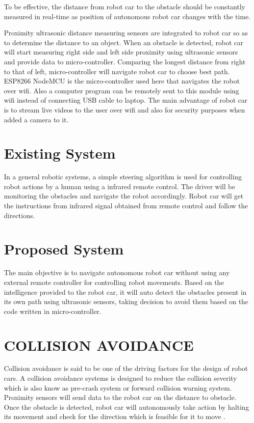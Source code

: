 \documentclass[sigconf]{acmart}
\begin{document}
To be effective, the distance from robot car to the obstacle should be constantly measured in real-time as position of autonomous robot car changes with the time.

Proximity ultrasonic distance measuring sensors are integrated to robot car so as to determine the distance to an object. When an obstacle is detected, robot car will start measuring right side and left side proximity using ultrasonic sensors and provide data to micro-controller. Comparing the longest distance from right to that of left, micro-controller will navigate robot car to choose best path. ESP8266 NodeMCU is the micro-controller used here that navigates the robot over wifi. Also a computer program can be remotely sent to this module using wifi instead of connecting USB cable to laptop. The main advantage of robot car is to stream live videos to the user over wifi and also for security purposes when added a camera to it.

\section{Existing System}
In a general robotic systems, a simple steering algorithm is used for controlling robot actions by a human using a infrared remote control. The driver will be monitoring the obstacles and navigate the robot accordingly. Robot car will get the instructions from infrared signal obtained from remote control and follow the directions.

\section{Proposed System}
The main objective is to navigate autonomous robot car without using any external remote controller for controlling robot movements. Based on the intelligence provided to the robot car, it will auto detect the obstacles present in its own path using ultrasonic sensors, taking decision to avoid them based on the code written in micro-controller.

\section{COLLISION AVOIDANCE}
Collision avoidance is said to be one of the driving factors for the design of robot cars. A collision avoidance systems is designed to reduce the collision severity which is also know as pre-crash system or forward collision warning system. Proximity sensors will send data to the robot car on the distance to obstacle. Once the obstacle is detected, robot  car will autonomously take action by halting its movement and check for the direction which is feasible for it to move \cite{stratis2009}. 
\end{document}
